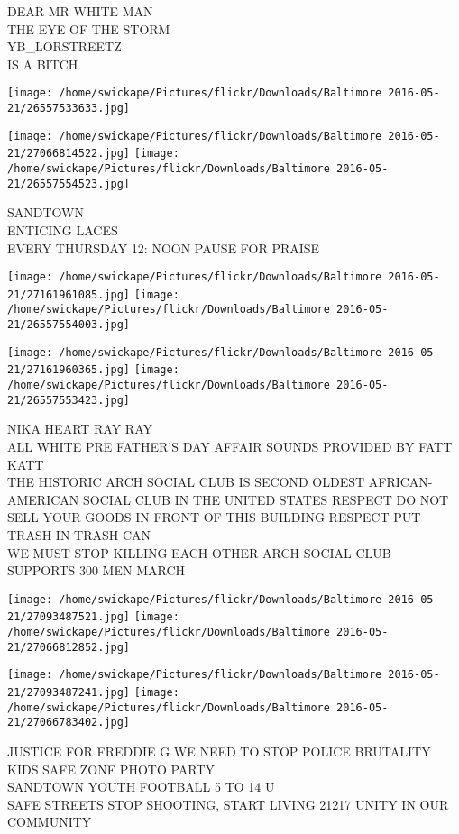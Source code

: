 \documentclass[10pt,letterpaper]{article}
\begin{document}
DEAR MR WHITE MAN\\
THE EYE OF THE STORM\\
YB\_LORSTREETZ\\
IS A BITCH
\pagebreak

\texttt{[image: /home/swickape/Pictures/flickr/Downloads/Baltimore 2016-05-21/26557533633.jpg]}

\vspace{0.25in}
\texttt{[image: /home/swickape/Pictures/flickr/Downloads/Baltimore 2016-05-21/27066814522.jpg]}
\texttt{[image: /home/swickape/Pictures/flickr/Downloads/Baltimore 2016-05-21/26557554523.jpg]}

SANDTOWN\\
ENTICING LACES\\
EVERY THURSDAY 12: NOON PAUSE FOR PRAISE
\pagebreak

\texttt{[image: /home/swickape/Pictures/flickr/Downloads/Baltimore 2016-05-21/27161961085.jpg]}
\texttt{[image: /home/swickape/Pictures/flickr/Downloads/Baltimore 2016-05-21/26557554003.jpg]}

\texttt{[image: /home/swickape/Pictures/flickr/Downloads/Baltimore 2016-05-21/27161960365.jpg]}
\texttt{[image: /home/swickape/Pictures/flickr/Downloads/Baltimore 2016-05-21/26557553423.jpg]}

NIKA HEART RAY RAY\\
ALL WHITE PRE FATHER'S DAY AFFAIR SOUNDS PROVIDED BY FATT KATT\\
THE HISTORIC ARCH SOCIAL CLUB IS SECOND OLDEST AFRICAN{-}AMERICAN SOCIAL CLUB IN THE UNITED STATES RESPECT DO NOT SELL YOUR GOODS IN FRONT OF THIS BUILDING RESPECT PUT TRASH IN TRASH CAN\\
WE MUST STOP KILLING EACH OTHER ARCH SOCIAL CLUB SUPPORTS 300 MEN MARCH
\pagebreak

\texttt{[image: /home/swickape/Pictures/flickr/Downloads/Baltimore 2016-05-21/27093487521.jpg]}
\texttt{[image: /home/swickape/Pictures/flickr/Downloads/Baltimore 2016-05-21/27066812852.jpg]}

\texttt{[image: /home/swickape/Pictures/flickr/Downloads/Baltimore 2016-05-21/27093487241.jpg]}
\texttt{[image: /home/swickape/Pictures/flickr/Downloads/Baltimore 2016-05-21/27066783402.jpg]}

JUSTICE FOR FREDDIE G WE NEED TO STOP POLICE BRUTALITY\\
KIDS SAFE ZONE PHOTO PARTY\\
SANDTOWN YOUTH FOOTBALL 5 TO 14 U\\
SAFE STREETS STOP SHOOTING, START LIVING 21217 UNITY IN OUR COMMUNITY
\pagebreak
\end{document}

